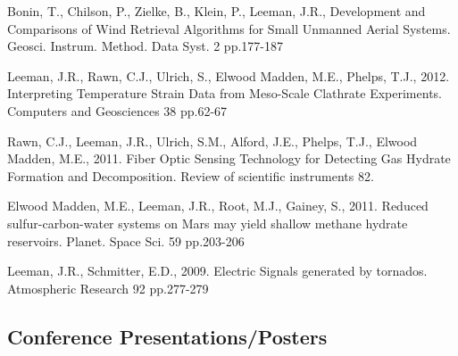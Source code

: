 \documentclass[letterpaper]{article}
\renewenvironment{itemize}{
  \begin{list}{}{
    \setlength{\leftmargin}{1.5em}
  }
}{
  \end{list}
}
\begin{document}
\begin{itemize}

\item Bonin, T., Chilson, P., Zielke, B., Klein, P., Leeman, J.R., Development and Comparisons of Wind Retrieval Algorithms for Small Unmanned Aerial Systems. Geosci. Instrum. Method. Data Syst. 2 pp.177-187

\item Leeman, J.R., Rawn, C.J., Ulrich, S., Elwood Madden, M.E., Phelps, T.J., 2012.  Interpreting Temperature Strain Data from Meso-Scale Clathrate Experiments. Computers and Geosciences 38 pp.62-67

\item Rawn, C.J., Leeman, J.R., Ulrich, S.M., Alford, J.E., Phelps, T.J., Elwood Madden, M.E., 2011. Fiber Optic Sensing Technology for Detecting Gas Hydrate Formation and Decomposition. Review of scientific instruments 82.

\item Elwood Madden, M.E., Leeman, J.R., Root, M.J., Gainey, S., 2011. Reduced sulfur-carbon-water systems on Mars may yield shallow methane hydrate reservoirs. Planet. Space Sci. 59 pp.203-206

\item Leeman, J.R., Schmitter, E.D., 2009. Electric Signals generated by tornados. Atmospheric Research 92 pp.277-279

\end{itemize}

\subsection*{Conference Presentations/Posters}
\end{document}

